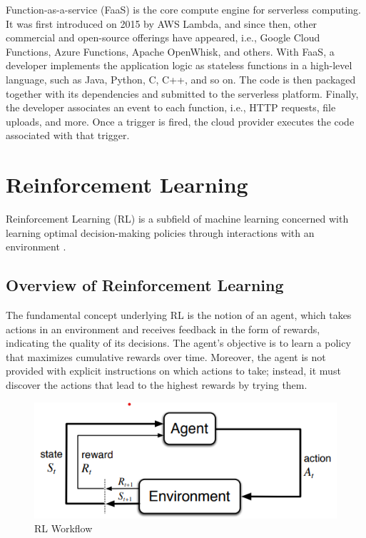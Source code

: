 Function-as-a-service (FaaS) is the core compute engine for serverless computing. It was first introduced on 2015 by AWS Lambda, and since then, other commercial and open-source offerings have appeared, i.e., Google Cloud Functions, Azure Functions, Apache OpenWhisk, and others. With FaaS, a developer implements the application logic as stateless functions in a high-level language, such as Java, Python, C, C++, and so on. The code is then packaged together with its dependencies and submitted to the serverless platform. Finally, the developer associates an event to each function, i.e., HTTP requests, file uploads, and more. Once a trigger is fired, the cloud provider executes the code associated with that trigger.

\section{Reinforcement Learning}

Reinforcement Learning (RL) is a subfield of machine learning concerned with learning optimal decision-making policies through interactions with an environment \cite{sutton2018reinforcement}. 

\subsection{Overview of Reinforcement Learning}
The fundamental concept underlying RL is the notion of an agent, which takes actions in an environment and receives feedback in the form of rewards, indicating the quality of its decisions. The agent's objective is to learn a policy that maximizes cumulative rewards over time. Moreover, the agent is not provided with explicit instructions on which actions to take; instead, it must discover the actions that lead to the highest rewards by trying them.

\begin{figure}[ht]
    \centering
    \includegraphics[scale=1]{images/rl-workflow.png}
    \caption{RL Workflow}
    \label{fig:sutton_rl_workflow}
\end{figure}

